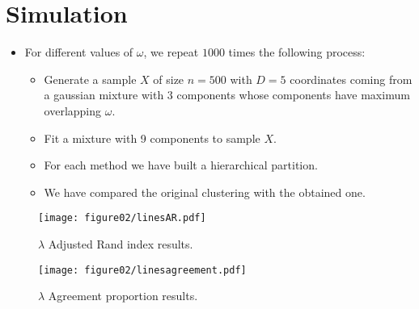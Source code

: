 \documentclass[10pt, a4paper]{article}
\newcommand{\m}[1]{\boldsymbol{#1}}
\begin{document}

%
%
%
%



\section{Simulation}

\begin{itemize}
\item For different values of $\omega$, we repeat $1000$ times the following process:
\begin{itemize}
\item Generate a sample $X$ of size $n=500$ with $D=5$ coordinates coming from a gaussian mixture with $3$ components whose components have maximum overlapping $\omega$.
\item Fit a mixture with 9 components to sample $X$.
\item For each method we have built a hierarchical partition.
\item We have compared the original clustering with the obtained one. 
\end{itemize}


\end{itemize}


\begin{figure}[!h]
\centering
\texttt{[image: figure02/linesAR.pdf]}
\caption{$\lambda$ Adjusted Rand index results.}
\label{fig:mua}
\end{figure}

\begin{figure}[!h]
\centering
\texttt{[image: figure02/linesagreement.pdf]}
\caption{$\lambda$ Agreement proportion results.}
\label{fig:mub}
\end{figure}



{}
\end{document}
